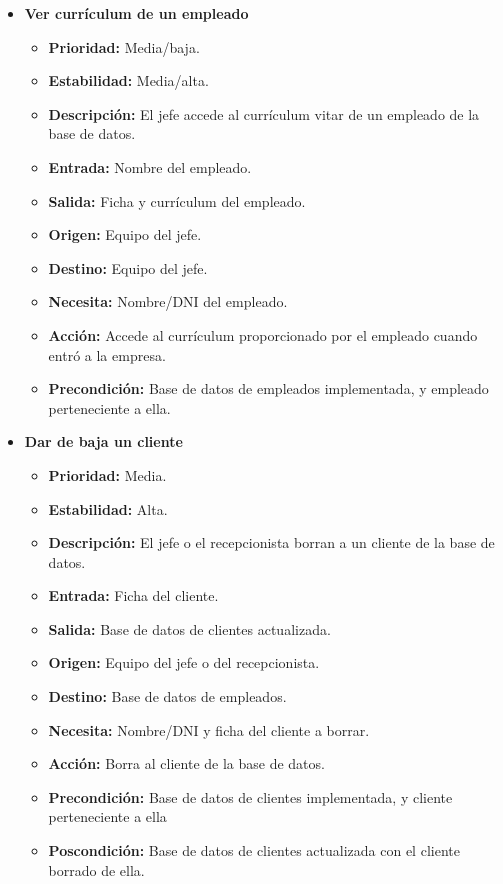 \documentclass[spanish,a4paper,11pt, twoside]{report}	%
\begin{document}
\begin{itemize}
\begin{itemize}
		\end{itemize}%

		\item \textbf{Ver currículum de un empleado}  %

		\begin{itemize}
			\item \textbf{Prioridad: }Media/baja.
			\item \textbf{Estabilidad: }Media/alta.
			\item \textbf{Descripción: }El jefe accede al currículum vitar de un empleado de la base de datos.
			\item \textbf{Entrada: } Nombre del empleado.
			\item \textbf{Salida: }Ficha y currículum del empleado.
			\item \textbf{Origen: }Equipo del jefe.
			\item \textbf{Destino: }Equipo del jefe. 
			\item \textbf{Necesita: }Nombre/DNI del empleado. 
			\item \textbf{Acción: }Accede al currículum proporcionado por el empleado cuando entró a la empresa.
			\item \textbf{Precondición: }Base de datos de empleados implementada, y empleado perteneciente a ella.

		\end{itemize}%

		\item \textbf{Dar de baja un cliente}  %

		\begin{itemize}
			\item \textbf{Prioridad: }Media.
			\item \textbf{Estabilidad: }Alta.
			\item \textbf{Descripción: }El jefe o el recepcionista borran a un cliente de la base de datos.
			\item \textbf{Entrada: } Ficha del cliente.
			\item \textbf{Salida: }Base de datos de clientes actualizada.
			\item \textbf{Origen: }Equipo del jefe o del recepcionista.
			\item \textbf{Destino: }Base de datos de empleados. 
			\item \textbf{Necesita: }Nombre/DNI y ficha del cliente a borrar. 
			\item \textbf{Acción: }Borra al cliente de la base de datos.
			\item \textbf{Precondición: }Base de datos de clientes implementada, y cliente perteneciente a ella
			\item \textbf{Poscondición: }Base de datos de clientes actualizada con el cliente borrado de ella. 


\end{itemize}
\end{itemize}
\end{document}
